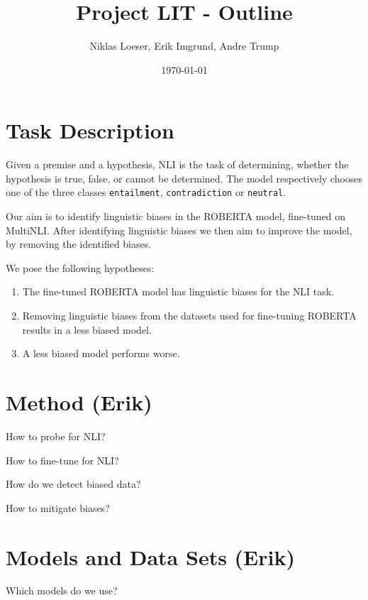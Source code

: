 \documentclass[12pt,a4paper]{article}
\title{Project LIT - Outline}
\author{Niklas Loeser, Erik Imgrund, Andre Trump}
\date{\today}
\begin{document}
\begin{acronym}
\end{acronym}

\maketitle

\section{Task Description}
Given a premise and a hypothesis, \ac{NLI} is the task of determining, whether the hypothesis is true, false, or cannot be determined. The model respectively chooses one of the three classes \texttt{entailment}, \texttt{contradiction} or \texttt{neutral}.

Our aim is to identify linguistic biases in the ROBERTA model, fine-tuned on MultiNLI. After identifying linguistic biases we then aim to improve the model, by removing the identified biases.

We pose the following hypotheses:
\begin{enumerate}
  \item The fine-tuned ROBERTA model has linguistic biases for the \ac{NLI} task.
  \item Removing linguistic biases from the datasets used for fine-tuning ROBERTA results in a less biased model.
  \item A less biased model performs worse. %
\end{enumerate}

\section{Method (Erik)}
How to probe for NLI?

How to fine-tune for NLI?

How do we detect biased data?

How to mitigate biases?

\section{Models and Data Sets (Erik)}
Which models do we use?
\end{document}
